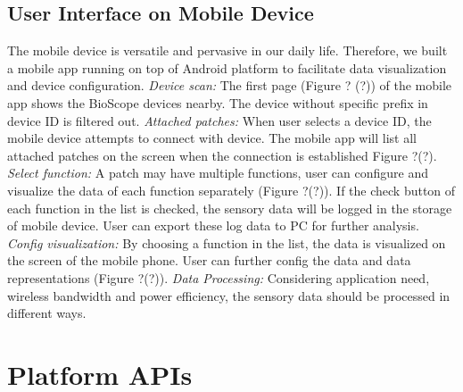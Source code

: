 \subsection{User Interface on Mobile Device}
The mobile device is versatile and pervasive in our daily life.
Therefore, we built a mobile app running on top of Android platform to facilitate data visualization and device configuration.
\vspace{10pt}
\newline
\textit{Device scan:}
\newline
The first page (Figure ? (?)) of the mobile app shows the BioScope devices nearby. The device without specific prefix in device ID is filtered out. 
\vspace{10pt}
\newline
\textit{Attached patches:}
\newline
When user selects a device ID, the mobile device attempts to connect with device. 
The mobile app will list all attached patches on the screen when the connection is established Figure ?(?).
\vspace{10pt}
\newline
\textit{Select function:}
\newline
A patch may have multiple functions, user can configure and visualize the data of each function separately (Figure ?(?)).
If the check button of each function in the list is checked, the sensory data will be logged in the storage of mobile device.
User can export these log data to PC for further analysis.
\vspace{10pt}
\newline
\textit{Config visualization:}
\newline
By choosing a function in the list, the data is visualized on the screen of the mobile phone. User can further config the data and data representations (Figure ?(?)).
\vspace{10pt}
\newline
\textit{Data Processing:}
\newline
Considering application need, wireless bandwidth and power efficiency, the sensory data should be processed in different ways.



\section{Platform APIs}



\let\cleardoublepage\clearpage